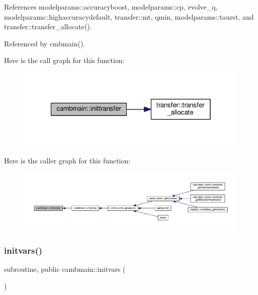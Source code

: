 References modelparams\+::accuracyboost, modelparams\+::cp, evolve\+\_\+q, modelparams\+::highaccuracydefault, transfer\+::mt, qmin, modelparams\+::taurst, and transfer\+::transfer\+\_\+allocate().



Referenced by cmbmain().

Here is the call graph for this function\+:
\nopagebreak
\begin{figure}[H]
\begin{center}
\leavevmode
\includegraphics[width=320pt]{namespacecambmain_a556b6e83160b14e40cffab6e0deb6e12_cgraph}
\end{center}
\end{figure}
Here is the caller graph for this function\+:
\nopagebreak
\begin{figure}[H]
\begin{center}
\leavevmode
\includegraphics[width=350pt]{namespacecambmain_a556b6e83160b14e40cffab6e0deb6e12_icgraph}
\end{center}
\end{figure}
\mbox{\label{namespacecambmain_a890ea024560967d80a83e411a34368ed}} 
\subsubsection{\texorpdfstring{initvars()}{initvars()}}
{\footnotesize\ttfamily subroutine, public cambmain\+::initvars (\begin{DoxyParamCaption}{ }\end{DoxyParamCaption})}



